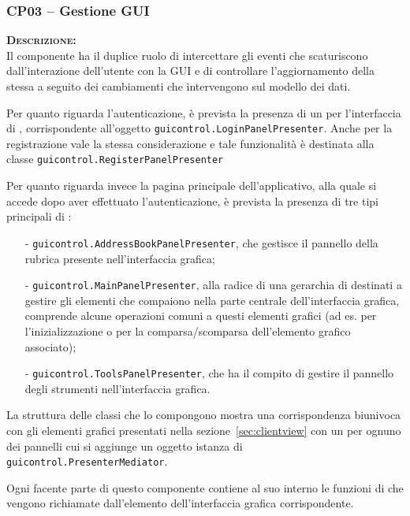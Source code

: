 \subsubsection{CP03 -- Gestione GUI}
\begin{description}
	\item{\scshape\bfseries Descrizione:}\\
Il componente ha il duplice ruolo di intercettare gli eventi che scaturiscono dall'interazione dell'utente con la GUI e di controllare l'aggiornamento della stessa a seguito dei cambiamenti che intervengono sul modello dei dati.

Per quanto riguarda l'autenticazione, è prevista la presenza di un  per l'interfaccia di , corrispondente all'oggetto \texttt{guicontrol.LoginPanelPresenter}. Anche per la registrazione vale la stessa considerazione e tale funzionalità è destinata alla classe \texttt{guicontrol.RegisterPanelPresenter}

Per quanto riguarda invece la pagina principale dell'applicativo, alla quale si accede dopo aver effettuato l'autenticazione, è prevista la presenza di tre tipi principali di :
\begin{itemize}[noitemsep,nolistsep]
  \item[-] \texttt{guicontrol.AddressBookPanelPresenter}, che gestisce il pannello della rubrica presente nell'interfaccia grafica;
  \item[-] \texttt{guicontrol.MainPanelPresenter}, alla radice di una gerarchia di  destinati a gestire gli elementi che compaiono nella parte centrale dell'interfaccia grafica, comprende alcune operazioni comuni a questi elementi grafici (ad es. per l'inizializzazione o per la comparsa/scomparsa dell'elemento grafico associato);
  \item[-] \texttt{guicontrol.ToolsPanelPresenter}, che ha il compito di gestire il pannello degli strumenti nell'interfaccia grafica.
\end{itemize}

La struttura delle classi che lo compongono mostra una corrispondenza biunivoca con gli elementi grafici presentati nella sezione~\ref{sec:clientview} con un  per ognuno dei pannelli cui si aggiunge un oggetto istanza di \texttt{guicontrol.PresenterMediator}.

Ogni  facente parte di questo componente contiene al suo interno le funzioni di  che vengono richiamate dall'elemento dell'interfaccia grafica corrispondente.


\end{description}

